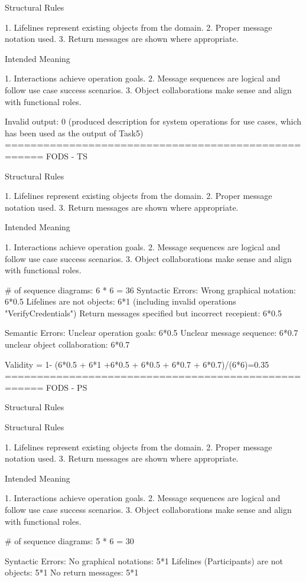 Structural Rules

1. Lifelines represent existing objects from the domain.
2. Proper message notation used.
3. Return messages are shown where appropriate.

Intended Meaning

1. Interactions achieve operation goals.
2. Message sequences are logical and follow use case success scenarios.
3. Object collaborations make sense and align with functional roles.

Invalid output: 0 (produced description for system operations for use cases, which has been used as the output of Task5)
====================================================
FODS - TS

Structural Rules

1. Lifelines represent existing objects from the domain.
2. Proper message notation used.
3. Return messages are shown where appropriate.

Intended Meaning

1. Interactions achieve operation goals.
2. Message sequences are logical and follow use case success scenarios.
3. Object collaborations make sense and align with functional roles.

# of sequence diagrams: 6 * 6 = 36
Syntactic Errors:
Wrong graphical notation: 6*0.5
Lifelines are not objects: 6*1 (including invalid operations "VerifyCredentials")
Return messages specified but incorrect recepient: 6*0.5

Semantic Errors:
Unclear operation goals: 6*0.5
Unclear message sequence: 6*0.7 
unclear object collaboration: 6*0.7	

Validity = 1- (6*0.5 + 6*1 +6*0.5 + 6*0.5 + 6*0.7 + 6*0.7)/(6*6)=0.35
====================================================
FODS - PS

Structural Rules

Structural Rules

1. Lifelines represent existing objects from the domain.
2. Proper message notation used.
3. Return messages are shown where appropriate.

Intended Meaning

1. Interactions achieve operation goals.
2. Message sequences are logical and follow use case success scenarios.
3. Object collaborations make sense and align with functional roles.

# of sequence diagrams: 5 * 6 = 30

Syntactic Errors: 
No graphical notations: 5*1
Lifelines (Participants) are not objects: 5*1
No return messages: 5*1

